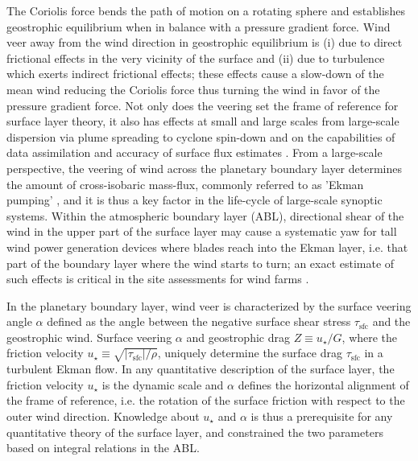\documentclass[smallcondensed,final]{svjour3}
\newcommand{\SFC}{\mathrm{sfc}}
\begin{document}
The Coriolis force bends the path of motion on a rotating sphere and establishes geostrophic equilibrium when in balance with a pressure gradient force. Wind veer away from the wind direction in geostrophic equilibrium is
(i) due to direct frictional effects in the very vicinity of the surface and
(ii) due to turbulence which exerts indirect frictional effects; these effects
cause a slow-down of the mean wind reducing the Coriolis force thus turning the wind
in favor of the pressure gradient force. 
Not only does the veering set the frame of reference for surface layer theory, it also has
effects at small and large scales from large-scale dispersion via plume spreading to
cyclone spin-down \citep{svensson:BM2009}
and on the capabilities of data assimilation and accuracy of surface flux estimates \citep{brown:QJR2005}. 
%
From a large-scale perspective, the veering of wind across the planetary boundary layer determines
the amount of cross-isobaric mass-flux, commonly referred to as 'Ekman pumping' \citep{ekman:AMA1905},
and it is thus a key factor in the life-cycle of large-scale synoptic systems.
%
% 
Within the atmospheric boundary layer (ABL), directional shear of the wind in
the upper part of the surface layer may cause a systematic yaw for tall wind power generation devices
where blades reach into the Ekman layer, i.e. that part of the boundary layer where the wind starts to turn;
an exact estimate of such effects is critical in the site assessments for wind farms
\citep{calaf:PF2010, mirocha:WES2018}. 
%
\par
%
In the planetary boundary layer, wind veer is characterized by the surface veering angle $\alpha$
defined as the angle between the negative surface shear stress $\tau_\SFC$ and the geostrophic wind.
%
Surface veering $\alpha$ and geostrophic drag $Z\equiv u_\star/G$, where the friction velocity $u_\star\equiv\sqrt{|\tau_\SFC|/\rho}$,
uniquely determine the surface drag $\tau_\SFC$ in a turbulent Ekman flow. 
%
In any quantitative description of the surface layer, the friction velocity $u_\star$ is the dynamic scale
and $\alpha$ defines the horizontal alignment of the frame of reference, i.e. the rotation of the surface 
friction with respect to the outer wind direction. 
%
Knowledge about $u_\star$ and $\alpha$ is thus a prerequisite for any quantitative theory of the surface layer, 
and \citet{rossby:PIP1935} constrained the two parameters based on integral relations in the ABL.
\end{document}
